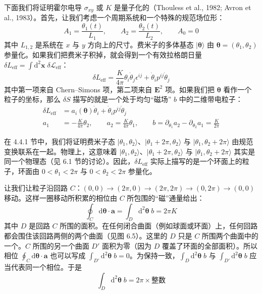 下面我们将证明霍尔电导 $\sigma_{xy}$ 或 $K$ 是量子化的（Thouless et al., 1982; Avron et al., 1983）。首先，让我们考虑一个周期系统和一个特殊的规范场位形：
\begin{equation*}
A_{1} = \frac{\theta_{1}(t)}{L_{1}}, \qquad A_{2} = \frac{\theta_{2}(t)}{L_{2}}, \qquad A_{0} = 0 \tag{4.4.1}
\end{equation*}
其中 $L_{1,2}$ 是系统在 $x$ 与 $y$ 方向上的尺寸。费米子的多体基态 $|\pmb{\theta}\rangle$ 由 $\pmb{\theta} = (\theta_{1}, \theta_{2})$ 参量化。如果我们把费米子积掉，就会得到一个有效拉格朗日量 $\delta L_{\mathrm{eff}} = \int \mathrm{d}^{2}\pmb{x}\; \delta\mathcal{L}_{\mathrm{eff}}$：
\begin{equation*}
\delta L_{\mathrm{eff}} = \frac{K}{4\pi} \theta_{i} \dot{\theta}_{j} \epsilon^{ij} + \dot{\theta}_{i} p^{ij} \dot{\theta}_{j}
\end{equation*}
其中第一项来自 Chern--Simons 项，第二项来自 $\pmb{E}^{2}$ 项。如果我们把 $\pmb{\theta}$ 看作一个粒子的坐标，那么 $\delta S$ 描写的就是一个处于均匀``磁场'' $b$ 中的二维带电粒子：
\begin{align*}
\delta L_{\mathrm{eff}} &= a_{i}(\pmb{\theta}) \dot{\theta}_{i} + \dot{\theta}_{i} p^{ij} \dot{\theta}_{j}\\
a_{1} &= -\frac{K}{4\pi} \theta_{2}, \qquad a_{2} = \frac{K}{4\pi} \theta_{1}, \qquad b = \partial_{\theta_{1}} a_{2} - \partial_{\theta_{2}} a_{1} = \frac{K}{2\pi}
\end{align*}

在 4.4.1 节中，我们将证明费米子态 $|\theta_{1}, \theta_{2}\rangle$、$|\theta_{1} + 2\pi, \theta_{2}\rangle$ 与 $|\theta_{1}, \theta_{2} + 2\pi\rangle$ 由规范变换联系在一起。物理上，这意味着 $|\theta_{1}, \theta_{2}\rangle$、$|\theta_{1} + 2\pi, \theta_{2}\rangle$ 与 $|\theta_{1}, \theta_{2} + 2\pi\rangle$ 其实是同一个物理态（见 6.1 节的讨论）。因此，$\delta L_{\mathrm{eff}}$ 实际上描写的是一个环面上的粒子，环面由 $0 < \theta_{1} < 2\pi$ 与 $0 < \theta_{2} < 2\pi$ 参量化。

让我们让粒子沿回路 $C$：$(0,0) \to (2\pi,0) \to (2\pi,2\pi) \to (0,2\pi) \to (0,0)$ 移动。这样一圈移动所积累的相位由 $C$ 所包围的``磁''通量给出：
\begin{equation*}
\oint_{C} \mathrm{d}\pmb{\theta} \cdot \pmb{a} = \int_{D} \mathrm{d}^{2}\pmb{\theta}\; b = 2\pi K
\end{equation*}
其中 $D$ 是回路 $C$ 所围的面积。在任何闭合曲面（例如球面或环面）上，任何回路都会围住该回路两侧的两个曲面（见图 6.5）。这里的 $D$ 只是 $C$ 所围两个曲面中的一个。$C$ 所围的另一个曲面 $D'$ 面积为零（因为 $D$ 覆盖了环面的全部面积）。所以相位 $\oint_{C} \mathrm{d}\pmb{\theta} \cdot \pmb{a}$ 也可以写成 $\int_{D'} \mathrm{d}^{2}\pmb{\theta}\; b = 0$。为保持一致，$\int_{D} \mathrm{d}^{2}\pmb{\theta}\; b$ 与 $\int_{D'} \mathrm{d}^{2}\pmb{\theta}\; b$ 应当代表同一个相位。于是
\begin{equation*}
\int_{D} \mathrm{d}^{2}\pmb{\theta}\; b = 2\pi \times \text{整数}
\end{equation*}

